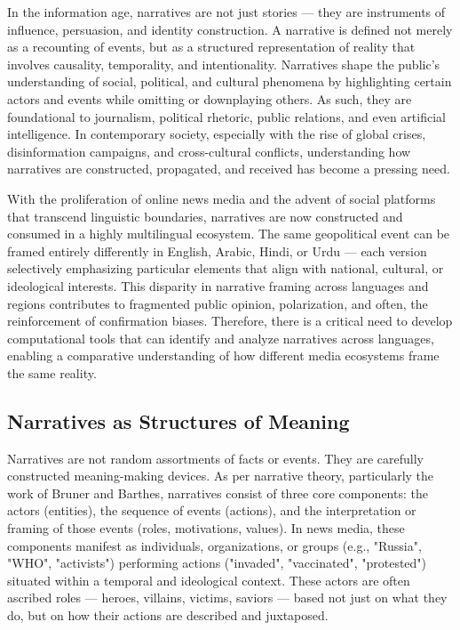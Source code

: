 \documentclass[12pt]{article}
\begin{document}
In the information age, narratives are not just stories — they are instruments of influence, persuasion, and identity construction. A narrative is defined not merely as a recounting of events, but as a structured representation of reality that involves causality, temporality, and intentionality. Narratives shape the public's understanding of social, political, and cultural phenomena by highlighting certain actors and events while omitting or downplaying others. As such, they are foundational to journalism, political rhetoric, public relations, and even artificial intelligence. In contemporary society, especially with the rise of global crises, disinformation campaigns, and cross-cultural conflicts, understanding how narratives are constructed, propagated, and received has become a pressing need.

With the proliferation of online news media and the advent of social platforms that transcend linguistic boundaries, narratives are now constructed and consumed in a highly multilingual ecosystem. The same geopolitical event can be framed entirely differently in English, Arabic, Hindi, or Urdu — each version selectively emphasizing particular elements that align with national, cultural, or ideological interests. This disparity in narrative framing across languages and regions contributes to fragmented public opinion, polarization, and often, the reinforcement of confirmation biases. Therefore, there is a critical need to develop computational tools that can identify and analyze narratives across languages, enabling a comparative understanding of how different media ecosystems frame the same reality.

\subsection*{Narratives as Structures of Meaning}

Narratives are not random assortments of facts or events. They are carefully constructed meaning-making devices. As per narrative theory, particularly the work of Bruner and Barthes, narratives consist of three core components: the actors (entities), the sequence of events (actions), and the interpretation or framing of those events (roles, motivations, values). In news media, these components manifest as individuals, organizations, or groups (e.g., "Russia", "WHO", "activists") performing actions ("invaded", "vaccinated", "protested") situated within a temporal and ideological context. These actors are often ascribed roles — heroes, villains, victims, saviors — based not just on what they do, but on how their actions are described and juxtaposed.
\end{document}
